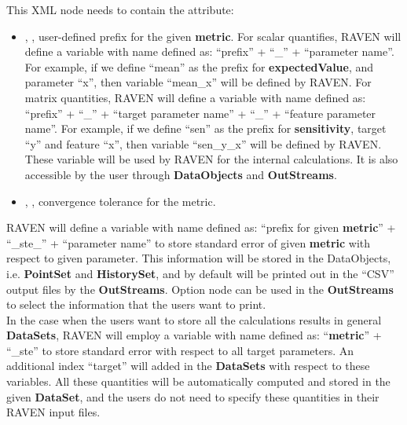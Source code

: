 {\begin{itemize}
      This XML node needs to contain the attribute:
      \begin{itemize}
        \itemsep0em
        \item {}, , user-defined prefix for the given \textbf{metric}.
          For scalar quantifies, RAVEN will define a variable with name defined as:  ``prefix'' + ``\_'' + ``parameter name''.
          For example, if we define ``mean'' as the prefix for \textbf{expectedValue}, and parameter ``x'', then variable
          ``mean\_x'' will be defined by RAVEN.
          For matrix quantities, RAVEN will define a variable with name defined as: ``prefix'' + ``\_'' + ``target parameter name'' + ``\_'' + ``feature parameter name''.
          For example, if we define ``sen'' as the prefix for \textbf{sensitivity}, target ``y'' and feature ``x'', then
          variable ``sen\_y\_x'' will be defined by RAVEN.
          \nb These variable will be used by RAVEN for the internal calculations. It is also accessible by the user through
          \textbf{DataObjects} and \textbf{OutStreams}.

          \item {}, , convergence tolerance for the metric.

      \end{itemize}

      RAVEN will define a variable with name defined as: ``prefix for given \textbf{metric}'' + ``\_ste\_'' + ``parameter name'' to
      store standard error of given \textbf{metric} with respect to given parameter. This information will be stored in the DataObjects,
      i.e. \textbf{PointSet} and \textbf{HistorySet}, and by default will be printed out in the ``CSV'' output files by the
      \textbf{OutStreams}. Option node  can be used in the \textbf{OutStreams} to select the information that
      the users want to print.\\

      In the case when the users want to store all the calculations results in general \textbf{DataSets}, RAVEN will employ a variable
      with name defined as: ``\textbf{metric}'' + ``\_ste'' to store standard error with respect to all target parameters. An additional
      index ``target'' will added in the \textbf{DataSets} with respect to these variables. All these quantities will be automatically
      computed and stored in the given \textbf{DataSet}, and the users do not need to specify these quantities in their RAVEN input files.\\


\end{itemize}}

